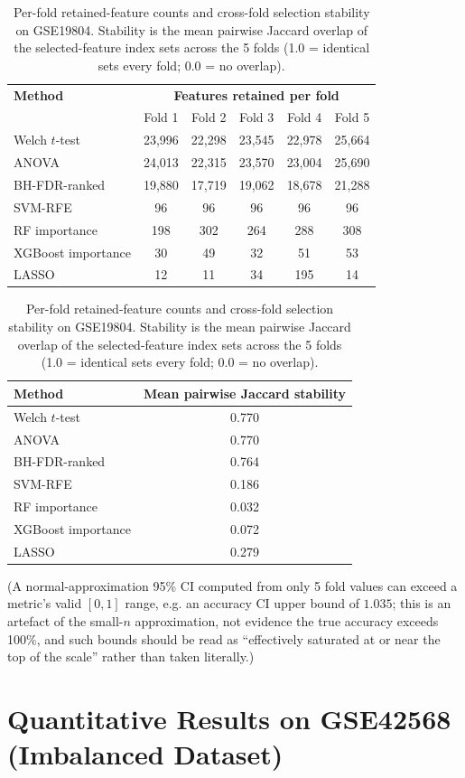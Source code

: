 \begin{table}[H]
\centering
\caption{Per-fold retained-feature counts and cross-fold selection stability on GSE19804. Stability is the mean pairwise Jaccard overlap of the selected-feature index sets across the 5 folds (1.0 = identical sets every fold; 0.0 = no overlap).}
\label{tab:gse19804_stability}
\begin{tabular}{lccccc}
\toprule
\textbf{Method} & \multicolumn{5}{c}{\textbf{Features retained per fold}} \\
 & Fold 1 & Fold 2 & Fold 3 & Fold 4 & Fold 5 \\
\midrule
Welch $t$-test & 23,996 & 22,298 & 23,545 & 22,978 & 25,664 \\
ANOVA & 24,013 & 22,315 & 23,570 & 23,004 & 25,690 \\
BH-FDR-ranked & 19,880 & 17,719 & 19,062 & 18,678 & 21,288 \\
SVM-RFE & 96 & 96 & 96 & 96 & 96 \\
RF importance & 198 & 302 & 264 & 288 & 308 \\
XGBoost importance & 30 & 49 & 32 & 51 & 53 \\
LASSO & 12 & 11 & 34 & 195 & 14 \\
\bottomrule
\end{tabular}

\medskip
\begin{tabular}{lc}
\toprule
\textbf{Method} & \textbf{Mean pairwise Jaccard stability} \\
\midrule
Welch $t$-test & 0.770 \\
ANOVA & 0.770 \\
BH-FDR-ranked & 0.764 \\
SVM-RFE & 0.186 \\
RF importance & 0.032 \\
XGBoost importance & 0.072 \\
LASSO & 0.279 \\
\bottomrule
\end{tabular}
\end{table}

(A normal-approximation 95\% CI computed from only 5 fold values can exceed a metric's valid $[0,1]$ range, e.g. an accuracy CI upper bound of $1.035$; this is an artefact of the small-$n$ approximation, not evidence the true accuracy exceeds 100\%, and such bounds should be read as ``effectively saturated at or near the top of the scale'' rather than taken literally.)

\section{Quantitative Results on GSE42568 (Imbalanced Dataset)}

